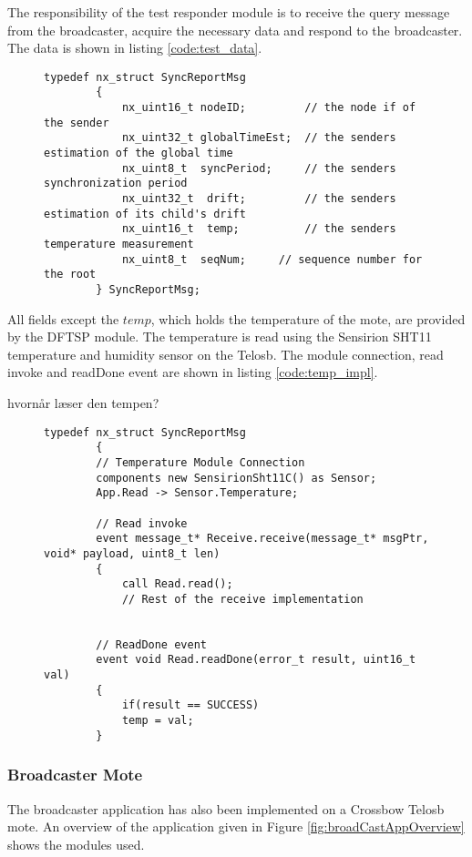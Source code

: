 \documentclass[Main]{subfiles}
\begin{document}
				The responsibility of the test responder module is to receive the query message from the broadcaster, acquire the necessary data and respond to the broadcaster.
				The data is shown in listing \ref{code:test_data}.

				\begin{figure}[H]
					\begin{lstlisting}[caption=DFTSP Test Data, style=Code-C, label=code:test_data]
		typedef nx_struct SyncReportMsg
		{
			nx_uint16_t	nodeID;			// the node if of the sender
			nx_uint32_t	globalTimeEst;	// the senders estimation of the global time
			nx_uint8_t  syncPeriod;		// the senders synchronization period
			nx_uint32_t  drift;			// the senders estimation of its child's drift
			nx_uint16_t  temp;			// the senders temperature measurement
			nx_uint8_t	seqNum;		// sequence number for the root
		} SyncReportMsg;

					\end{lstlisting}
				\end{figure}

				All fields except the $temp$, which holds the temperature of the mote, are provided by the DFTSP module.
				The temperature is read using the Sensirion SHT11\cite{tempSensorDatasheet} temperature and humidity sensor on the Telosb.
				The module connection, read invoke and readDone event are shown in listing \ref{code:temp_impl}.

				hvornår læser den tempen?

				\begin{figure}[H]
					\begin{lstlisting}[caption=Temperature reading implementation, style=Code-C, label=code:temp_impl]
		typedef nx_struct SyncReportMsg
		{
		// Temperature Module Connection
		components new SensirionSht11C() as Sensor;
		App.Read -> Sensor.Temperature;

		// Read invoke
		event message_t* Receive.receive(message_t* msgPtr, void* payload, uint8_t len)
		{
	    	call Read.read();
	    	// Rest of the receive implementation


		// ReadDone event
		event void Read.readDone(error_t result, uint16_t val)
		{
			if(result == SUCCESS)
			temp = val;
		}

						\end{lstlisting}
				\end{figure}
		
		
		\subsubsection{Broadcaster Mote} %
		\label{sub:broadcaster_mote}
			The broadcaster application has also been implemented on a Crossbow Telosb mote. 
			An overview of the application given in Figure \ref{fig:broadCastAppOverview} shows the modules used. 
\end{document}
